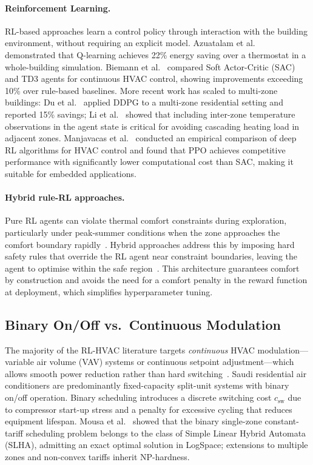 \documentclass[12pt,a4paper]{article}
\let\oldsubsection\subsection
\renewcommand{\subsection}[1]{\FloatBarrier\oldsubsection{#1}}
\newcommand{\csw}{c_{\mathrm{sw}}}
\begin{document}
\paragraph{Reinforcement Learning.}
RL-based approaches learn a control policy through interaction with the
building environment, without requiring an explicit model.
Azuatalam et al.~\cite{Azuatalam2020} demonstrated that Q-learning achieves
22\% energy saving over a thermostat in a whole-building simulation.
Biemann et al.~\cite{Biemann2021} compared Soft Actor-Critic (SAC) and
TD3 agents for continuous HVAC control, showing improvements exceeding
10\% over rule-based baselines.
More recent work has scaled to multi-zone buildings: Du et al.~\cite{Du2021b}
applied DDPG to a multi-zone residential setting and reported 15\% savings;
Li et al.~\cite{Li2024MZ} showed that including inter-zone temperature
observations in the agent state is critical for avoiding cascading heating
load in adjacent zones.
Manjavacas et al.~\cite{Manjavacas2024} conducted an empirical comparison
of deep RL algorithms for HVAC control and found that PPO achieves
competitive performance with significantly lower computational cost than
SAC, making it suitable for embedded applications.

\paragraph{Hybrid rule-RL approaches.}
Pure RL agents can violate thermal comfort constraints during
exploration, particularly under peak-summer conditions when the zone
approaches the comfort boundary rapidly~\cite{Xu2025}.
Hybrid approaches address this by imposing hard safety rules that override
the RL agent near constraint boundaries, leaving the agent to optimise
within the safe region~\cite{Solinas2024,Xu2025}.
This architecture guarantees comfort by construction and avoids the need
for a comfort penalty in the reward function at deployment, which simplifies
hyperparameter tuning.

\subsection{Binary On/Off vs.\ Continuous Modulation}

The majority of the RL-HVAC literature targets \emph{continuous} HVAC
modulation---variable air volume (VAV) systems or continuous setpoint
adjustment---which allows smooth power reduction rather than hard
switching~\cite{Wang2024DRL,Guo2025}.
Saudi residential air conditioners are predominantly fixed-capacity
split-unit systems with binary on/off operation.
Binary scheduling introduces a discrete switching cost $\csw$ due to
compressor start-up stress and a penalty for excessive cycling that
reduces equipment lifespan.
Mousa et al.~\cite{Mousa2018} showed that the binary single-zone
constant-tariff scheduling problem belongs to the class of Simple Linear
Hybrid Automata (SLHA), admitting an exact optimal solution in LogSpace;
extensions to multiple zones and non-convex tariffs inherit NP-hardness.
\end{document}
